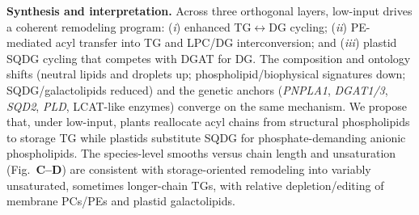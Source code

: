 \documentclass[10pt,letterpaper]{article}
\begin{document}
\noindent \textbf{Synthesis and interpretation.}
Across three orthogonal layers, low-input drives a coherent remodeling program: (\emph{i}) enhanced TG$\leftrightarrow$DG cycling; (\emph{ii}) PE-mediated acyl transfer into TG and LPC/DG interconversion; and (\emph{iii}) plastid SQDG cycling that competes with DGAT for DG. The composition and ontology shifts (neutral lipids and droplets up; phospholipid/biophysical signatures down; SQDG/galactolipids reduced) and the genetic anchors (\textit{PNPLA1}, \textit{DGAT1/3}, \textit{SQD2}, \textit{PLD}, LCAT-like enzymes) converge on the same mechanism. We propose that, under low-input, plants reallocate acyl chains from structural phospholipids to storage TG while plastids substitute SQDG for phosphate-demanding anionic phospholipids. The species-level smooths versus chain length and unsaturation (Fig.\ \textbf{C–D}) are consistent with storage-oriented remodeling into variably unsaturated, sometimes longer-chain TGs, with relative depletion/editing of membrane PCs/PEs and plastid galactolipids.
\end{document}
